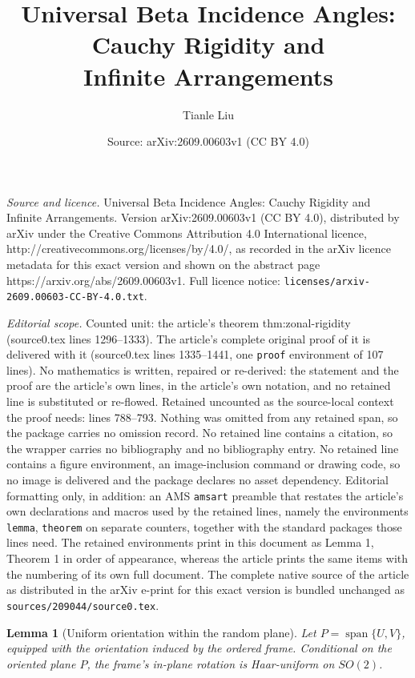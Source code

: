 \documentclass[10pt,a4paper]{amsart}
\title{Universal Beta Incidence Angles: Cauchy Rigidity and\\ Infinite Arrangements}
\author{Tianle Liu}
\date{Source: arXiv:2609.00603v1 (CC BY 4.0)}
\newtheorem{lemma}{Lemma}
\begin{document}
\maketitle

\noindent\emph{Source and licence.} Universal Beta Incidence Angles: Cauchy Rigidity and\\ Infinite Arrangements. Version arXiv:2609.00603v1 (CC BY 4.0), distributed by arXiv under the Creative Commons Attribution 4.0 International licence, http://creativecommons.org/licenses/by/4.0/, as recorded in the arXiv licence metadata for this exact version and shown on the abstract page https://arxiv.org/abs/2609.00603v1. Full licence notice: \texttt{licenses/arxiv-2609.00603-CC-BY-4.0.txt}.\par\smallskip

\noindent\textit{Editorial scope.} Counted unit: the article's theorem thm:zonal-rigidity (source0.tex lines 1296--1333). The article's complete original proof of it is delivered with it (source0.tex lines 1335--1441, one \texttt{proof} environment of 107 lines). No mathematics is written, repaired or re-derived: the statement and the proof are the article's own lines, in the article's own notation, and no retained line is substituted or re-flowed.  Retained uncounted as the source-local context the proof needs: lines 788--793.  Nothing was omitted from any retained span, so the package carries no omission record.  No retained line contains a citation, so the wrapper carries no bibliography and no bibliography entry.  No retained line contains a figure environment, an image-inclusion command or drawing code, so no image is delivered and the package declares no asset dependency.  Editorial formatting only, in addition: an AMS \texttt{amsart} preamble that restates the article's own declarations and macros used by the retained lines, namely the environments \texttt{lemma}, \texttt{theorem} on separate counters, together with the standard packages those lines need.  The retained environments print in this document as Lemma 1, Theorem 1 in order of appearance, whereas the article prints the same items with the numbering of its own full document.  The complete native source of the article as distributed in the arXiv e-print for this exact version is bundled unchanged as \texttt{sources/209044/source0.tex}.
\begin{lemma}[Uniform orientation within the random plane]
\label{lem:uniform-frame-phase}
Let \(P=\operatorname{span}\{U,V\}\), equipped with the orientation induced
by the ordered frame.  Conditional on the oriented plane \(P\), the frame's
in-plane rotation is Haar-uniform on \(SO(2)\).
\end{lemma}
\end{document}
